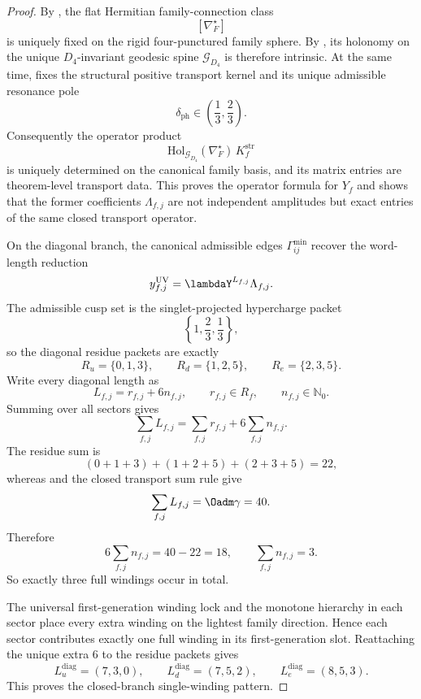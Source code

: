 \begin{proof}
By , the flat Hermitian family-connection class
\[
[\nabla_F^\star]
\]
is uniquely fixed on the rigid four-punctured family sphere. By
, its holonomy on the unique
$D_4$-invariant geodesic spine $\mathcal G_{D_4}$ is therefore intrinsic. At the same time,
 fixes the structural positive
transport kernel and its unique admissible resonance pole
\[
\delta_{\mathrm{ph}}\in\left(\frac13,\frac23\right).
\]
Consequently the operator product
\[
\mathrm{Hol}_{\mathcal G_{D_4}}(\nabla_F^\star)\,K_f^{\mathrm{str}}
\]
is uniquely determined on the canonical family basis, and its matrix entries are theorem-level
transport data. This proves the operator formula for $Y_f$ and shows that the former coefficients
$\Lambda_{f,j}$ are not independent amplitudes but exact entries of the same closed transport
operator.

On the diagonal branch, the canonical admissible edges $\Gamma_{ij}^{\min}$ recover the word-length
reduction
\[
y_{f,j}^{\mathrm{UV}}=\lambdaY^{L_{f,j}}\Lambda_{f,j}.
\]
The admissible cusp set is the singlet-projected hypercharge packet
\[
\left\{1,\frac23,\frac13\right\},
\]
so the diagonal residue packets are exactly
\[
R_u=\{0,1,3\},
\qquad
R_d=\{1,2,5\},
\qquad
R_e=\{2,3,5\}.
\]
Write every diagonal length as
\[
L_{f,j}=r_{f,j}+6n_{f,j},
\qquad
r_{f,j}\in R_f,
\qquad
n_{f,j}\in\mathbb N_0.
\]
Summing over all sectors gives
\[
\sum_{f,j}L_{f,j}
=
\sum_{f,j}r_{f,j}+6\sum_{f,j}n_{f,j}.
\]
The residue sum is
\[
(0+1+3)+(1+2+5)+(2+3+5)=22,
\]
whereas  and the closed transport sum rule give
\[
\sum_{f,j}L_{f,j}=\Oadm\gamma=40.
\]
Therefore
\[
6\sum_{f,j}n_{f,j}=40-22=18,
\qquad
\sum_{f,j}n_{f,j}=3.
\]
So exactly three full windings occur in total.

The universal first-generation winding lock and the monotone hierarchy in each sector place every
extra winding on the lightest family direction. Hence each sector contributes exactly one full
winding in its first-generation slot. Reattaching the unique extra $6$ to the residue packets gives
\[
L_u^{\mathrm{diag}}=(7,3,0),\qquad
L_d^{\mathrm{diag}}=(7,5,2),\qquad
L_e^{\mathrm{diag}}=(8,5,3).
\]
This proves the closed-branch single-winding pattern.
\end{proof}

